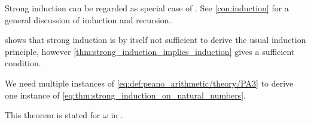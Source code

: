 \begin{comments}
  \item Strong induction can be regarded as special case of . See \cref{con:induction} for a general discussion of induction and recursion.

  \item {} shows that strong induction is by itself not sufficient to derive the usual induction principle, however \cref{thm:strong_induction_implies_induction} gives a sufficient condition.

  \item We need multiple instances of \eqref{eq:def:peano_arithmetic/theory/PA3} to derive one instance of \eqref{eq:thm:strong_induction_on_natural_numbers}.

  \item This theorem is stated for \( \omega \) in \cite[87]{Enderton1977SetTheory}.
\end{comments}

